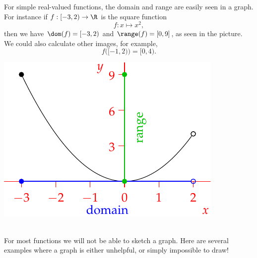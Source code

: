 \noindent\begin{minipage}{0.62\textwidth}
		For simple real-valued functions, the domain and range are easily seen in a graph. For instance if $f:[-3,2)\to\R$ is the square function
		\[f:x\mapsto x^2,\]
		then we have $\dom(f)=[-3,2)$ and $\range(f)=[0,9]$, as seen in the picture. We could also calculate other images, for example,
  	\[f\bigl([-1,2)\bigr)=[0,4).\]
  \end{minipage}\hfill
  \begin{minipage}{0.33\textwidth}
  \includegraphics[width=\textwidth]{sets-10-rangedom}
  \end{minipage}\\
  
\noindent For most functions we will not be able to sketch a graph. Here are several examples where a graph is either unhelpful, or simply impossible to draw!
  
